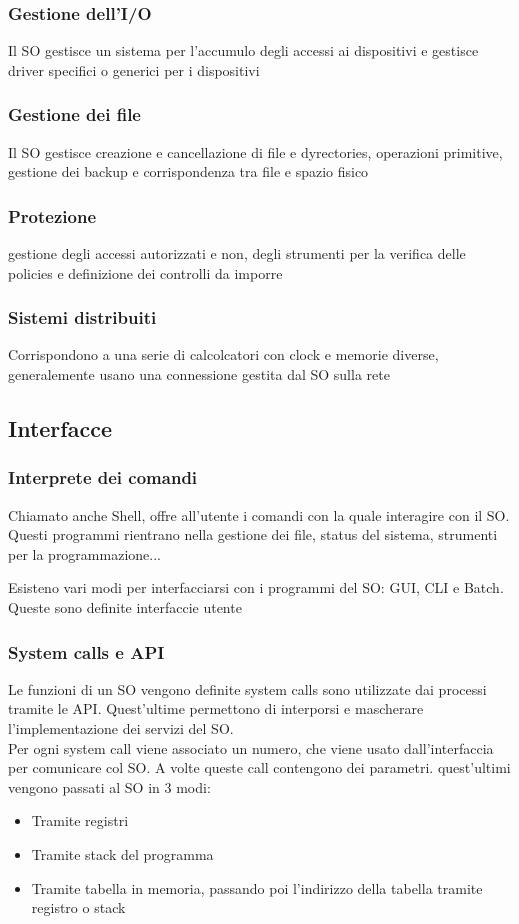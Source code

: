 \documentclass[12pt, a4paper]{article}
\begin{document}
\subsubsection{Gestione dell'I/O}
Il SO gestisce un sistema per l'accumulo degli accessi ai dispositivi e gestisce driver specifici o generici per 
i dispositivi

\subsubsection{Gestione dei file}
Il SO gestisce creazione e cancellazione di file e dyrectories, operazioni primitive, gestione dei backup e 
corrispondenza tra file e spazio fisico

\subsubsection{Protezione}
gestione degli accessi autorizzati e non, degli strumenti per la verifica delle policies e definizione dei
controlli da imporre

\subsubsection{Sistemi distribuiti}
Corrispondono a una serie di calcolcatori con clock e memorie diverse, generalemente usano una connessione 
gestita dal SO sulla rete

\subsection{Interfacce}

\subsubsection{Interprete dei comandi}
Chiamato anche Shell, offre all'utente i comandi con la quale interagire con il SO. Questi programmi rientrano
nella gestione dei file, status del sistema, strumenti per la programmazione...

Esisteno vari modi per interfacciarsi con i programmi del SO: GUI, CLI e Batch. Queste sono definite interfaccie 
utente

\subsubsection{System calls e API}
Le funzioni di un SO vengono definite system calls sono utilizzate dai processi tramite le API. Quest'ultime 
permettono di interporsi e mascherare l'implementazione dei servizi del SO.\\ Per ogni system call viene associato
un numero, che viene usato dall'interfaccia per comunicare col SO. A volte queste call contengono dei parametri. 
quest'ultimi vengono passati al SO in 3 modi:
\begin{itemize}
    \item Tramite registri
    \item Tramite stack del programma
    \item Tramite tabella in memoria, passando poi l'indirizzo della tabella tramite registro o stack
\end{itemize}
\end{document}
